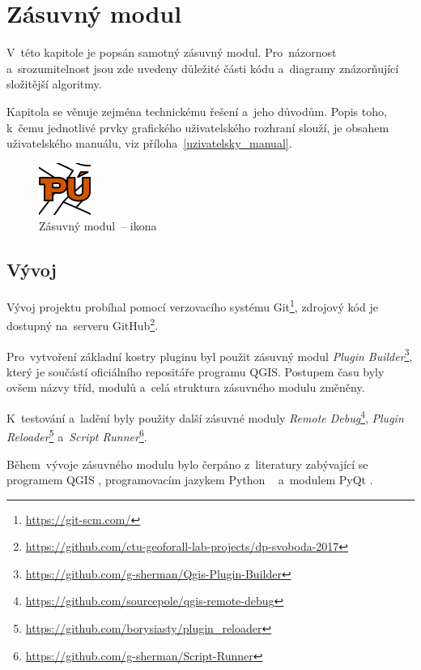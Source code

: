 \chapter{Zásuvný modul}
\label{plugin}

V~této kapitole je popsán samotný zásuvný modul. Pro~názornost
a~srozumitelnost jsou zde uvedeny důležité části kódu a~diagramy
znázorňující složitější algoritmy.

Kapitola se věnuje zejména technickému řešení a~jeho důvodům. Popis
toho, k~čemu jednotlivé prvky grafického uživatelského rozhraní
slouží, je obsahem uživatelského manuálu, viz
příloha~\ref{uzivatelsky_manual}.

	\begin{figure}[H] \centering
		\includegraphics[width=.1\textwidth]{./pictures/puplugin.png}
		\caption[Zásuvný modul~– ikona]{Zásuvný modul~– ikona}
		\label{fig:ikona_pluginu}
 	\end{figure}

\section{Vývoj}
\label{vyvoj}

Vývoj projektu probíhal pomocí verzovacího systému
Git\footnote{\url{https://git-scm.com/}}, zdrojový kód je dostupný
na~serveru
GitHub\footnote{\url{https://github.com/ctu-geoforall-lab-projects/dp-svoboda-2017}}.

Pro~vytvoření základní kostry pluginu byl použit zásuvný modul
\textit{Plugin
Builder}\footnote{\url{https://github.com/g-sherman/Qgis-Plugin-Builder}},
který je součástí oficiálního repositáře programu QGIS. Postupem času
byly ovšem názvy tříd, modulů a~celá struktura zásuvného modulu
změněny.

K~testování a~ladění byly použity další zásuvné moduly \textit{Remote
Debug}\footnote{\url{https://github.com/sourcepole/qgis-remote-debug}},
\textit{Plugin
Reloader}\footnote{\url{https://github.com/borysiasty/plugin_reloader}}
a~\textit{Script
Runner}\footnote{\url{https://github.com/g-sherman/Script-Runner}}.

Během~vývoje zásuvného modulu bylo čerpáno z~literatury zabývající se
programem QGIS \citep{pyqgis_book}, programovacím jazykem Python
\citep{python3_oop_book}~\citep{dive_into_python} a~modulem PyQt
\citep{pyqt_book}.

